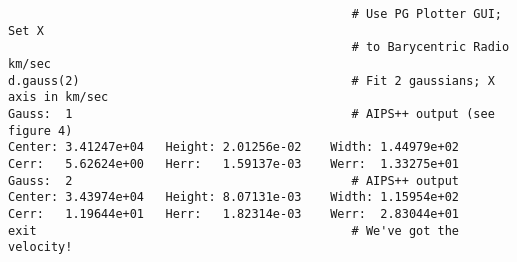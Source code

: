 
\begin{verbatim}
                                                # Use PG Plotter GUI; Set X
                                                # to Barycentric Radio km/sec
d.gauss(2)                                      # Fit 2 gaussians; X axis in km/sec 
Gauss:  1                                       # AIPS++ output (see figure 4)
Center: 3.41247e+04   Height: 2.01256e-02    Width: 1.44979e+02 
Cerr:   5.62624e+00   Herr:   1.59137e-03    Werr:  1.33275e+01 
Gauss:  2                                       # AIPS++ output 
Center: 3.43974e+04   Height: 8.07131e-03    Width: 1.15954e+02
Cerr:   1.19644e+01   Herr:   1.82314e-03    Werr:  2.83044e+01 
exit                                            # We've got the velocity!
\end{verbatim}
